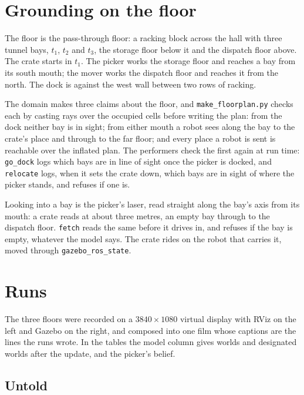 \documentclass[11pt,a4paper]{article}
\theoremstyle{definition}
\newcommand{\code}[1]{\texttt{\small #1}}
\begin{document}
\section{Grounding on the floor}
\label{sec:floor}

The floor is the pass-through floor: a racking block across the hall with
three tunnel bays, $t_1$, $t_2$ and $t_3$, the storage floor below it and the
dispatch floor above. The crate starts in $t_1$. The picker works the storage
floor and reaches a bay from its south mouth; the mover works the dispatch floor
and reaches it from the north. The dock is against the west wall between two
rows of racking.

The domain makes three claims about the floor, and \code{make\_floorplan.py}
checks each by casting rays over the occupied cells before writing the plan:
from the dock neither bay is in sight; from either mouth a robot sees along the
bay to the crate's place and through to the far floor; and every place a robot
is sent is reachable over the inflated plan. The performers check the first
again at run time: \code{go\_dock} logs which bays are in line of sight once
the picker is docked, and \code{relocate} logs, when it sets the crate down,
which bays are in sight of where the picker stands, and refuses if one is.

Looking into a bay is the picker's laser, read straight along the bay's axis
from its mouth: a crate reads at about three metres, an empty bay through to
the dispatch floor. \code{fetch} reads the same before it drives in, and
refuses if the bay is empty, whatever the model says. The crate rides on the
robot that carries it, moved through \code{gazebo\_ros\_state}.

\section{Runs}
\label{sec:runs}

The three floors were recorded on a $3840 \times 1080$ virtual display with
RViz on the left and Gazebo on the right, and composed into one film whose
captions are the lines the runs wrote. In the tables the model column gives
worlds and designated worlds after the update, and the picker's belief.

\subsection{Untold}
\end{document}
